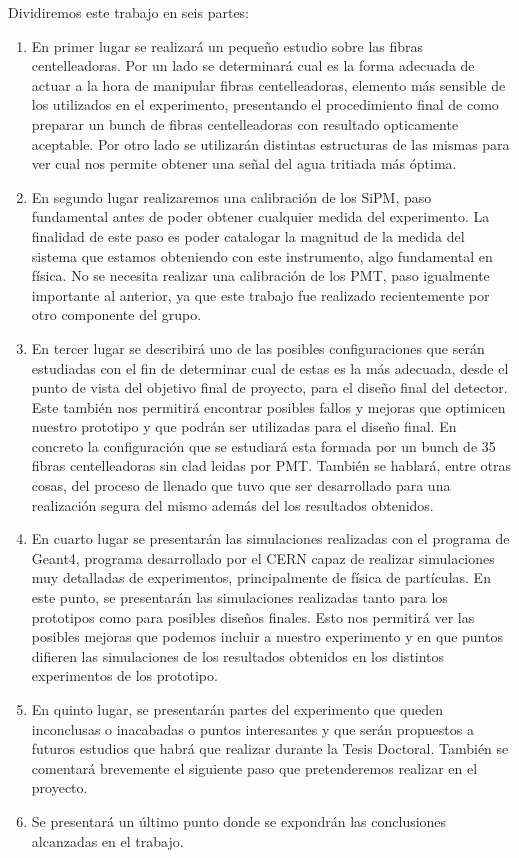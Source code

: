 Dividiremos este trabajo en seis partes:
\begin{enumerate}
\item{} En primer lugar se realizará un pequeño estudio sobre las fibras centelleadoras. Por un lado se determinará cual es la forma adecuada de actuar a la hora de manipular fibras centelleadoras, elemento más sensible de los utilizados en el experimento, presentando el procedimiento final de como preparar un bunch de fibras centelleadoras con resultado opticamente aceptable. Por otro lado se utilizarán distintas estructuras de las mismas para ver cual nos permite obtener una señal del agua tritiada  más óptima. 

\item{} En segundo lugar realizaremos una calibración de los SiPM, paso fundamental antes de poder obtener cualquier medida del experimento. La finalidad de este paso es poder catalogar la magnitud de la medida del sistema que estamos obteniendo con este instrumento, algo fundamental en física. No se necesita realizar una calibración de los PMT, paso igualmente importante al anterior, ya que este trabajo fue realizado recientemente por otro componente del grupo.

\item{} En tercer lugar se describirá uno de las posibles configuraciones que serán estudiadas con el fin de determinar cual de estas es la más adecuada, desde el punto de vista del objetivo final de proyecto, para el diseño final del detector. Este también nos permitirá encontrar posibles fallos y mejoras que optimicen nuestro prototipo y que podrán ser utilizadas para el diseño final. En concreto la configuración que se estudiará esta formada por un bunch de 35 fibras centelleadoras sin clad leidas por PMT. También se hablará, entre otras cosas, del proceso de llenado que tuvo que ser desarrollado para una realización segura del mismo además del los resultados obtenidos.

\item{} En cuarto lugar se presentarán las simulaciones realizadas con el programa de Geant4\cite{Geant4a,Geant4b,Geant4c}, programa desarrollado por el CERN capaz de realizar simulaciones muy detalladas de experimentos, principalmente de física de partículas. En este punto, se presentarán las simulaciones realizadas tanto para los prototipos como para posibles diseños finales. Esto nos permitirá ver las posibles mejoras que podemos incluir a nuestro experimento y en que puntos difieren  las simulaciones de los resultados obtenidos en los distintos experimentos de los prototipo.

\item{} En quinto lugar, se presentarán partes del experimento que queden inconclusas o inacabadas o puntos interesantes y que serán propuestos a futuros estudios que habrá que realizar durante la Tesis Doctoral. También se comentará brevemente el siguiente paso que pretenderemos realizar en el proyecto.

\item{} Se presentará un último punto donde se expondrán las conclusiones alcanzadas en el trabajo.

\end{enumerate}